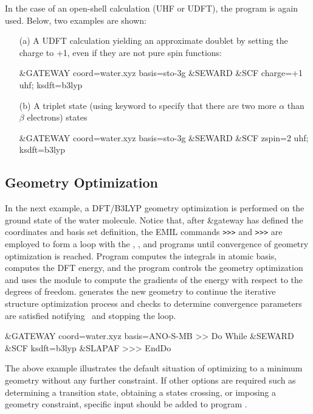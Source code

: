 In the case of an open-shell calculation (UHF or UDFT), the  program is again used.
Below, two examples are shown:

\begin{enumerate}
\item[(a)] A UDFT calculation yielding an approximate doublet by setting the charge to +1, even if they are not pure spin functions:
\begin{inputlisting}
&GATEWAY
 coord=water.xyz
 basis=sto-3g
&SEWARD
&SCF
 charge=+1
 uhf; ksdft=b3lyp
\end{inputlisting}

\item[(b)] A triplet state (using keyword  to specify that there are two more $\alpha$ than $\beta$ electrons) states
\begin{inputlisting}
&GATEWAY
 coord=water.xyz
 basis=sto-3g
&SEWARD
&SCF
 zspin=2
 uhf; ksdft=b3lyp
\end{inputlisting}

\end{enumerate}


\subsection{Geometry Optimization}
In the next example, a DFT/B3LYP geometry optimization is performed on the
ground state of the water molecule. Notice that, after \&gateway has defined
the coordinates and basis set definition, the EMIL commands \verb=>>>= 
and \verb=>>>=  are employed to form a loop with the
, , and  programs until convergence of geometry optimization is reached.
Program  computes the integrals in atomic basis,  computes the DFT energy, and the program
 controls the geometry optimization and uses the module  to compute the gradients
of the energy with respect to the degrees of freedom.  generates
the new geometry to continue the iterative structure optimization process and
checks to determine convergence parameters are satisfied notifying \molcas\ and stopping the loop.

\begin{inputlisting}
&GATEWAY
 coord=water.xyz
 basis=ANO-S-MB
>> Do While
  &SEWARD
  &SCF
    ksdft=b3lyp
  &SLAPAF
>>> EndDo
\end{inputlisting}

The above example illustrates the default situation of optimizing to a minimum geometry without
any further constraint. If other options are required such as determining a transition
state, obtaining a states crossing, or imposing a geometry constraint, specific input
should be added to program .


